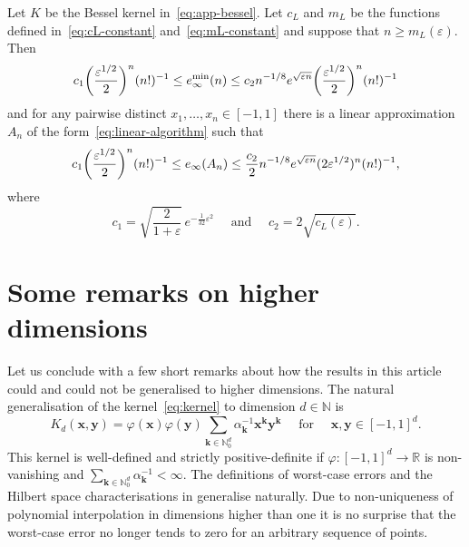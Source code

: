 \documentclass{mcom-l}
\numberwithin{equation}{section}
\numberwithin{theorem}{section} %
\renewcommand{\b}[1]{\bm{#1}}
\newcommand{\R}{\mathbb{R}} %
\newcommand{\N}{\mathbb{N}} %
\begin{document}
\begin{corollary}
  Let $K$ be the Bessel kernel in~\eqref{eq:app-bessel}.
  Let $c_L$ and $m_L$ be the functions defined in~\eqref{eq:cL-constant} and~\eqref{eq:mL-constant} and suppose that $n \geq m_L(\varepsilon)$.
  Then
  \begin{equation*}
    c_1 \bigg( \frac{\varepsilon^{1/2}}{2} \bigg)^{n} (n!)^{-1} \leq e_\infty^{\min}(n) \leq  c_2 n^{-1/8} e^{\sqrt{\smash[b]{\varepsilon n}}} \bigg( \frac{\varepsilon^{1/2}}{2} \bigg)^{n} (n!)^{-1}
  \end{equation*}
  and for any pairwise distinct $x_1, \ldots, x_n \in [-1, 1]$ there is a linear approximation $A_n$ of the form~\eqref{eq:linear-algorithm} such that
  \begin{equation*}
    c_1 \bigg( \frac{\varepsilon^{1/2}}{2} \bigg)^{n} (n!)^{-1} \leq e_\infty(A_n) \leq \frac{c_2}{2} n^{-1/8} e^{\sqrt{\smash[b]{\varepsilon n}}} (2\varepsilon^{1/2})^{n} (n!)^{-1},
  \end{equation*}
  where
  \begin{equation*}
    c_1 = \sqrt{ \frac{2}{1 + \varepsilon}} \, e^{-\frac{1}{32} \varepsilon^2} \quad \text{ and } \quad c_2 = 2 \sqrt{c_L(\varepsilon)}.
  \end{equation*}
\end{corollary}

\section{Some remarks on higher dimensions}

Let us conclude with a few short remarks about how the results in this article could and could not be generalised to higher dimensions.
The natural generalisation of the kernel~\eqref{eq:kernel} to dimension $d \in \N$ is
\begin{equation} \label{eq:kernel-multivariate}
  K_d(\b{x}, \b{y}) = \varphi(\b{x}) \varphi(\b{y}) \sum_{ \b{k} \in \N_0^d} \alpha_{\b{k}}^{-1} \b{x}^{\pmb{k}} \b{y}^{\pmb{k}} \quad \text{ for } \quad \b{x}, \b{y} \in [-1, 1]^d.
\end{equation}
This kernel is well-defined and strictly positive-definite if $\varphi \colon [-1, 1]^d \to \R$ is non-vanishing and $\sum_{\b{k} \in \N_0^d} \alpha_{\b{k}}^{-1} < \infty$.
The definitions of worst-case errors and the Hilbert space characterisations in  generalise naturally.
Due to non-uniqueness of polynomial interpolation in dimensions higher than one it is no surprise that the worst-case error no longer tends to zero for an arbitrary sequence of points.
\end{document}

